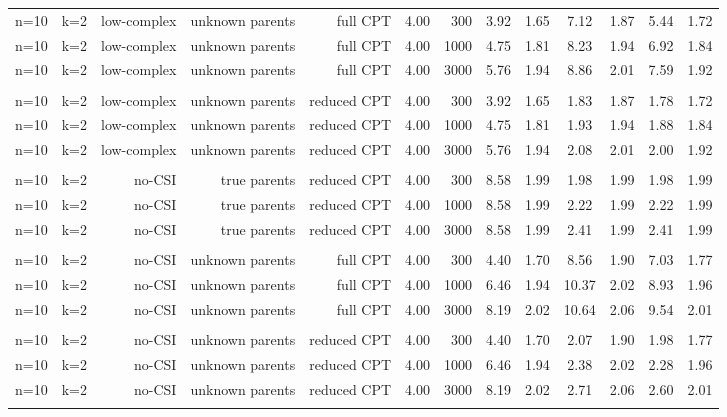 \begin{table}[ht]
\begin{tabular}{rrrrrrr|cc|cc|cc}
   \\ 
n=10 & k=2 & low-complex & unknown parents & full CPT & 4.00 & 300 & 3.92 & 1.65 & 7.12 & 1.87 & 5.44 & 1.72 \\ 
  n=10 & k=2 & low-complex & unknown parents & full CPT & 4.00 & 1000 & 4.75 & 1.81 & 8.23 & 1.94 & 6.92 & 1.84 \\ 
  n=10 & k=2 & low-complex & unknown parents & full CPT & 4.00 & 3000 & 5.76 & 1.94 & 8.86 & 2.01 & 7.59 & 1.92 \\ 
   \\ 
n=10 & k=2 & low-complex & unknown parents & reduced CPT & 4.00 & 300 & 3.92 & 1.65 & 1.83 & 1.87 & 1.78 & 1.72 \\ 
  n=10 & k=2 & low-complex & unknown parents & reduced CPT & 4.00 & 1000 & 4.75 & 1.81 & 1.93 & 1.94 & 1.88 & 1.84 \\ 
  n=10 & k=2 & low-complex & unknown parents & reduced CPT & 4.00 & 3000 & 5.76 & 1.94 & 2.08 & 2.01 & 2.00 & 1.92 \\ 
   \\ 
n=10 & k=2 & no-CSI & true parents & reduced CPT & 4.00 & 300 & 8.58 & 1.99 & 1.98 & 1.99 & 1.98 & 1.99 \\ 
  n=10 & k=2 & no-CSI & true parents & reduced CPT & 4.00 & 1000 & 8.58 & 1.99 & 2.22 & 1.99 & 2.22 & 1.99 \\ 
  n=10 & k=2 & no-CSI & true parents & reduced CPT & 4.00 & 3000 & 8.58 & 1.99 & 2.41 & 1.99 & 2.41 & 1.99 \\ 
   \\ 
n=10 & k=2 & no-CSI & unknown parents & full CPT & 4.00 & 300 & 4.40 & 1.70 & 8.56 & 1.90 & 7.03 & 1.77 \\ 
  n=10 & k=2 & no-CSI & unknown parents & full CPT & 4.00 & 1000 & 6.46 & 1.94 & 10.37 & 2.02 & 8.93 & 1.96 \\ 
  n=10 & k=2 & no-CSI & unknown parents & full CPT & 4.00 & 3000 & 8.19 & 2.02 & 10.64 & 2.06 & 9.54 & 2.01 \\ 
   \\ 
n=10 & k=2 & no-CSI & unknown parents & reduced CPT & 4.00 & 300 & 4.40 & 1.70 & 2.07 & 1.90 & 1.98 & 1.77 \\ 
  n=10 & k=2 & no-CSI & unknown parents & reduced CPT & 4.00 & 1000 & 6.46 & 1.94 & 2.38 & 2.02 & 2.28 & 1.96 \\ 
  n=10 & k=2 & no-CSI & unknown parents & reduced CPT & 4.00 & 3000 & 8.19 & 2.02 & 2.71 & 2.06 & 2.60 & 2.01 \\ 
   \bottomrule 
 \multicolumn{13}{l}{\scriptsize } 
 \end{tabular}
\end{table}
